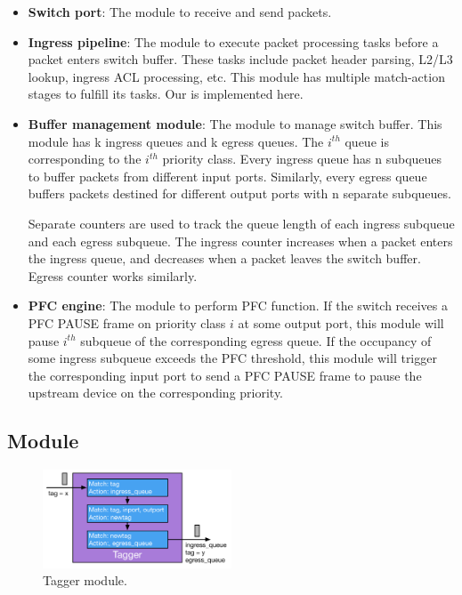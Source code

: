 \begin{itemize}
	\item \textbf{Switch port}: The module to receive and send packets.
	
	\item \textbf{Ingress pipeline}: The module to execute packet processing tasks before a packet enters switch buffer. These tasks include packet header parsing, L2/L3 lookup, ingress ACL processing, etc.  This module has multiple match-action stages to fulfill its tasks. Our \sysname{} is implemented here.
	
	\item \textbf{Buffer management module}: The module to manage switch buffer. This module has k ingress queues and k egress queues. The $i^{th}$ queue is corresponding to the $i^{th}$ priority class. Every ingress queue has n subqueues to buffer packets from different input ports. Similarly, every egress queue buffers packets destined for different output ports with n separate subqueues.
	
	Separate counters are used to track the queue length of each ingress subqueue and each egress subqueue. The ingress counter increases when a packet enters the ingress queue, and decreases when a packet leaves the switch buffer. Egress counter works similarly. 
	
	
	\item \textbf{PFC engine}: The module to perform PFC function. If the switch receives a PFC PAUSE frame on priority class $i$ at some output port, this module will pause $i^{th}$ subqueue of the corresponding egress queue. If the occupancy of some ingress subqueue exceeds the PFC threshold, this module will trigger the corresponding input port to send a PFC PAUSE frame to pause the upstream device on the corresponding priority. 

\end{itemize}


\subsection{\sysname{} Module}\label{subsec:acl}

\begin{figure}
	\hspace{-0.2in}
	\centering
	\includegraphics[width=0.5\textwidth] {figs/tagger}
	\caption{Tagger module.}\label{fig:tagger}
	
\end{figure}

